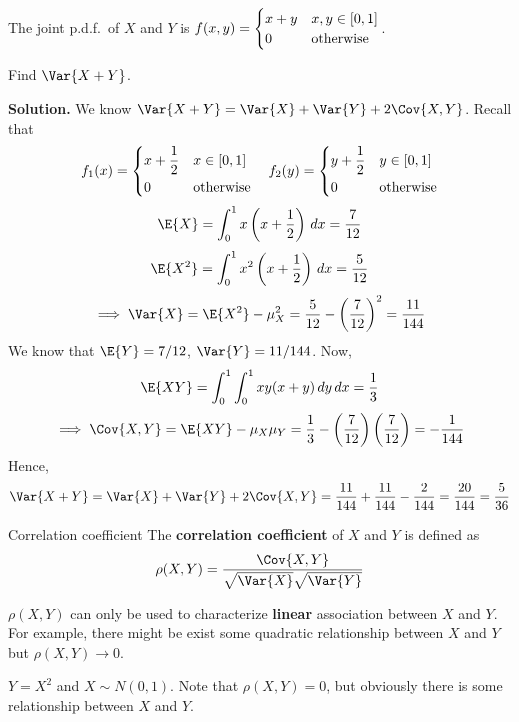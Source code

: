 \begin{Example}{}{}
    The joint p.d.f.\ of $ X $ and $ Y $ is
    $ f(x,y)=\begin{cases}
            x+y & x,y\in\interval{0}{1} \\
            0   & \text{otherwise}
        \end{cases} $.

    Find $ \Var{X+Y} $.

    \textbf{Solution.} We know $ \Var{X+Y}=\Var{X}+\Var{Y}+2\Cov{X,Y} $. Recall
    that
    \[ f_1(x)=\begin{dcases}
            x+\frac{1}{2} & x\in\interval{0}{1} \\
            0             & \text{otherwise}
        \end{dcases}\quad
        f_2(y)=\begin{dcases}
            y+\frac{1}{2} & y\in\interval{0}{1} \\
            0             & \text{otherwise}
        \end{dcases} \]
    \[ \E{X}=\int_{0}^{1} x\left( x+\frac{1}{2}  \right)\, d{x} =
        \frac{7}{12} \]
    \[ \E{X^2}=\int_{0}^{1} x^2\left( x+\frac{1}{2}  \right)\, d{x}=
        \frac{5}{12} \]
    \[ \implies\Var{X}=\E{X^2}-\mu_X^2=\frac{5}{12}-\left( \frac{7}{12} \right)^2=\frac{11}{144}  \]
    We know that $ \E{Y}=7/12 $, $ \Var{Y}=11/144 $. Now,
    \[ \E{XY}=
        \int_{0}^{1} \int_{0}^{1} x y(x+y)\, d{y}\, d{x}=\frac{1}{3}  \]
    \[ \implies \Cov{X,Y}=\E{XY}-\mu_X\mu_Y=
        \frac{1}{3} -\left( \frac{7}{12}  \right)\left( \frac{7}{12}  \right)=
        -\frac{1}{144}  \]
    Hence,
    \[ \Var{X+Y}=\Var{X}+\Var{Y}+2\Cov{X,Y}=
        \frac{11}{144} +\frac{11}{144} -\frac{2}{144} =\frac{20}{144}=\frac{5}{36} \]
\end{Example}
\begin{Definition}{Correlation coefficient}{}
    The \textbf{correlation coefficient} of $ X $ and $ Y $ is defined as
    \[ \rho(X,Y)=\frac{\Cov{X,Y}}{\sqrt{\Var{X}}\sqrt{\Var{Y}}}  \]
\end{Definition}
\begin{Remark}{}{}
    $ \rho(X,Y) $ can only be used to characterize \textbf{linear} association
    between $ X $ and $ Y $. For example, there might be exist some quadratic
    relationship between $ X $ and $ Y $ but $ \rho(X,Y)\to 0 $.
\end{Remark}
\begin{Example}{}{}
    $ Y=X^2 $ and $ X \sim N(0,1) $. Note that $ \rho(X,Y)=0 $,
    but obviously there is some relationship between $ X $ and $ Y $.
\end{Example}
